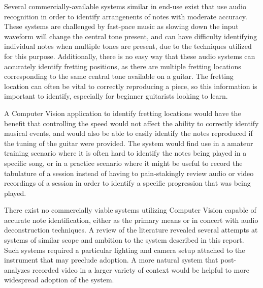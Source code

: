 Several commercially-available systems\cite{chordify,riffstation} similar in end-use exist
that use audio recognition in order to identify arrangenents of notes with moderate accuracy.
These systems are challenged by fast-pace music as slowing down the input waveform will change
the central tone present, and can have difficulty identifying individual notes when multiple
tones are present, due to the techniques utilized for this purpose. Additionally, there is no
easy way that these audio systems can accurately identify fretting positions, as there are
multiple fretting locations corresponding to the same central tone available on a guitar.
The fretting location can often be vital to correctly reproducing a piece, so this information
is important to identify, especially for beginner guitarists looking to learn.
\par
A Computer Vision application to identify fretting locations would have the benefit that controlling
the speed would not affect the ability to correctly identify musical events, and would also be
able to easily identify the notes reproduced if the tuning of the guitar were provided.
The system would find use in a amateur training scenario where it is often hard to identify the
notes being played in a specific song, or in a practice scenario where it might be useful to record
the tabulature of a session instead of having to pain-stakingly review audio or video recordings of
a session in order to identify a specific progression that was being played.
\par
There exist no commercially viable systems utilizing Computer Vision capable of accurate note
identification, either as the primary means or in concert with audio deconstruction techniques.
A review of the literature revealed several attempts at systems of similar scope and ambition to
the system described in this report\cite{GuitarTabulizer,CVFinger}. Such systems required a
particular lighting and camera setup attached to the instrument that may preclude adoption.
A more natural system that post-analyzes recorded video in a larger variety of context would
be helpful to more widespread adoption of the system.
